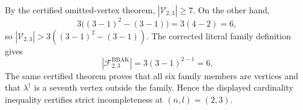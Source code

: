 By the certified omitted-vertex theorem, \(|\mathcal V_{2,3}|\ge7\). On the other hand,
\[
3\bigl((3-1)^2-(3-1)\bigr)=3(4-2)=6,
\]
so \(|\mathcal V_{2,3}|>3((3-1)^2-(3-1))\). The corrected literal family definition gives
\[
|\mathcal F^{\mathrm{BBAK}}_{2,3}|=3(3-1)^{2-1}=6.
\]
The same certified theorem proves that all six family members are vertices and that \(\lambda^\dagger\) is a seventh vertex outside the family. Hence the displayed cardinality inequality certifies strict incompleteness at \((n,l)=(2,3)\).